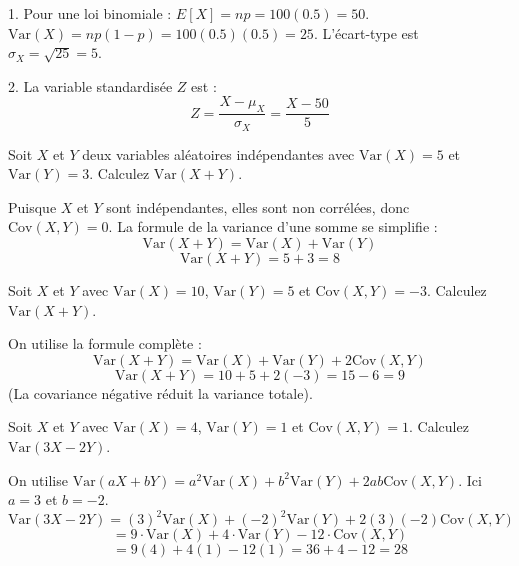 \begin{correctionbox}
1. Pour une loi binomiale :
$E[X] = np = 100(0.5) = 50$.
$\text{Var}(X) = np(1-p) = 100(0.5)(0.5) = 25$.
L'écart-type est $\sigma_X = \sqrt{25} = 5$.

2. La variable standardisée $Z$ est :
$$Z = \frac{X - \mu_X}{\sigma_X} = \frac{X - 50}{5}$$
\end{correctionbox}

\begin{exercicebox}
Soit $X$ et $Y$ deux variables aléatoires indépendantes avec $\text{Var}(X)=5$ et $\text{Var}(Y)=3$. Calculez $\text{Var}(X+Y)$.
\end{exercicebox}

\begin{correctionbox}
Puisque $X$ et $Y$ sont indépendantes, elles sont non corrélées, donc $\text{Cov}(X,Y)=0$.
La formule de la variance d'une somme se simplifie :
$$\text{Var}(X+Y) = \text{Var}(X) + \text{Var}(Y)$$
$$\text{Var}(X+Y) = 5 + 3 = 8$$
\end{correctionbox}

\begin{exercicebox}
Soit $X$ et $Y$ avec $\text{Var}(X)=10$, $\text{Var}(Y)=5$ et $\text{Cov}(X,Y)=-3$. Calculez $\text{Var}(X+Y)$.
\end{exercicebox}

\begin{correctionbox}
On utilise la formule complète :
$$\text{Var}(X+Y) = \text{Var}(X) + \text{Var}(Y) + 2\text{Cov}(X,Y)$$
$$\text{Var}(X+Y) = 10 + 5 + 2(-3) = 15 - 6 = 9$$
(La covariance négative réduit la variance totale).
\end{correctionbox}

\begin{exercicebox}
Soit $X$ et $Y$ avec $\text{Var}(X)=4$, $\text{Var}(Y)=1$ et $\text{Cov}(X,Y)=1$. Calculez $\text{Var}(3X - 2Y)$.
\end{exercicebox}

\begin{correctionbox}
On utilise $\text{Var}(aX+bY) = a^2\text{Var}(X) + b^2\text{Var}(Y) + 2ab\text{Cov}(X,Y)$.
Ici $a=3$ et $b=-2$.
$$\text{Var}(3X - 2Y) = (3)^2\text{Var}(X) + (-2)^2\text{Var}(Y) + 2(3)(-2)\text{Cov}(X,Y)$$
$$= 9 \cdot \text{Var}(X) + 4 \cdot \text{Var}(Y) - 12 \cdot \text{Cov}(X,Y)$$
$$= 9(4) + 4(1) - 12(1) = 36 + 4 - 12 = 28$$
\end{correctionbox}


